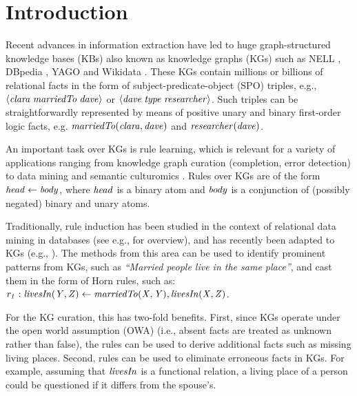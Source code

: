 \section{Introduction}
\label{sec:intro}

Recent advances in information extraction have led to
huge graph-structured knowledge bases (KBs) also known as knowledge graphs (KGs) such as NELL \cite{nell}, DBpedia \cite{dbpedia}, YAGO \cite{yago} and Wikidata \cite{wikidata}. These KGs contain millions or billions of relational facts in the form of subject-predicate-object (SPO) triples, e.g., $\langle\mathit{clara\;marriedTo\;dave}\rangle$ or $\langle\mathit{dave\;type\;researcher}\rangle$. Such triples can be straightforwardly represented by means of positive unary and binary first-order logic facts, e.g. $\mathit{marriedTo(clara,dave)}$ and $\mathit{researcher(dave)}$.

An important task over KGs is rule learning, which is relevant for a variety of applications ranging from knowledge graph curation (completion, error detection) \cite{DBLP:journals/semweb/Paulheim17} to data mining and semantic culturomics \cite{suchanek2014semantic}. Rules over KGs are of the form $\mathit{head \leftarrow body}$, where $\mathit{head}$ is a binary atom and $\mathit{body}$ is a conjunction of (possibly negated) binary and unary atoms. 

Traditionally, rule induction has been studied in the context of relational data mining in databases (see e.g., \cite{DBLP:books/daglib/0021868} for overview), and has recently been adapted to KGs (e.g., \cite{amie,op,rdf2rules}). The methods from this area can be used to identify prominent patterns from KGs, such as \emph{``Married people live in the same
place''}, and cast them in the form of Horn rules, such as:
$\mathit{r_1:\;}\mathit{livesIn(Y,Z)}\leftarrow \mathit{marriedTo(X,Y),livesIn(X,Z)}$. 

For the KG curation, this has two-fold benefits. First, since KGs operate under the open world
assumption (OWA) (i.e., absent facts are treated as unknown rather than false),
the rules can be used to derive additional facts such as missing living places. %
Second, rules can be used to eliminate erroneous facts in KGs. For example, assuming that $\mathit{livesIn}$ is a functional relation, %
a living place of a person could be questioned if it differs from the spouse's.

